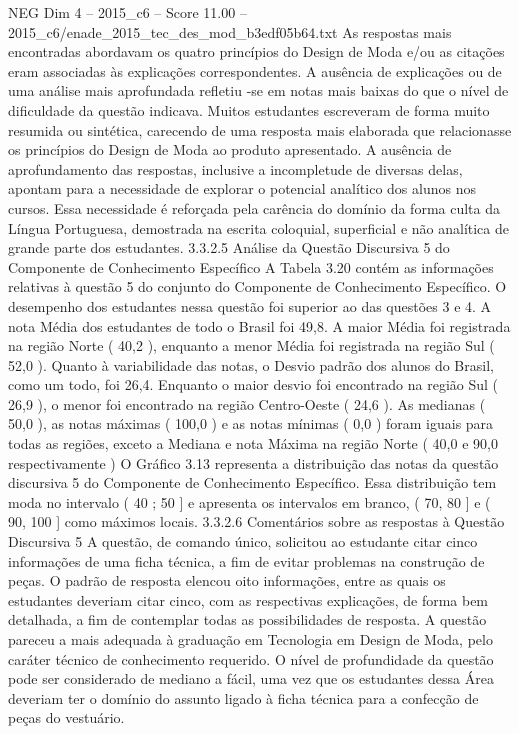 \begin{textsample}{NEG Dim 4 – 2015\_c6 – Score 11.00 – 2015\_c6/enade\_2015\_tec\_des\_mod\_b3edf05b64.txt}
As respostas mais encontradas abordavam os quatro princípios do Design de Moda e/ou as citações eram associadas às explicações correspondentes.
A ausência de explicações ou de uma análise mais aprofundada refletiu -se em notas mais baixas do que o nível de dificuldade da questão indicava.
Muitos estudantes escreveram de forma muito resumida ou sintética, carecendo de uma resposta mais elaborada que relacionasse os princípios do Design de Moda ao produto apresentado.
A ausência de aprofundamento das respostas, inclusive a incompletude de diversas delas, apontam para a necessidade de explorar o potencial analítico dos alunos nos cursos.
Essa necessidade é reforçada pela carência do domínio da forma culta da Língua Portuguesa, demostrada na escrita coloquial, superficial e não analítica de grande parte dos estudantes. 3.3.2.5 Análise da Questão Discursiva 5 do Componente de Conhecimento Específico A Tabela 3.20 contém as informações relativas à questão 5 do conjunto do Componente de Conhecimento Específico.
O desempenho dos estudantes nessa questão foi superior ao das questões 3 e 4.
A nota Média dos estudantes de todo o Brasil foi 49,8.
A maior Média foi registrada na região Norte ( 40,2 ), enquanto a menor Média foi registrada na região Sul ( 52,0 ).
Quanto à variabilidade das notas, o Desvio padrão dos alunos do Brasil, como um todo, foi 26,4.
Enquanto o maior desvio foi encontrado na região Sul ( 26,9 ), o menor foi encontrado na região Centro-Oeste ( 24,6 ).
As medianas ( 50,0 ), as notas máximas ( 100,0 ) e as notas mínimas ( 0,0 ) foram iguais para todas as regiões, exceto a Mediana e nota Máxima na região Norte ( 40,0 e 90,0 respectivamente ) O Gráfico 3.13 representa a distribuição das notas da questão discursiva 5 do Componente de Conhecimento Específico.
Essa distribuição tem moda no intervalo ( 40 ; 50 ] e apresenta os intervalos em branco, ( 70, 80 ] e ( 90, 100 ] como máximos locais. 3.3.2.6 Comentários sobre as respostas à Questão Discursiva 5 A questão, de comando único, solicitou ao estudante citar cinco informações de uma ficha técnica, a fim de evitar problemas na construção de peças.
O padrão de resposta elencou oito informações, entre as quais os estudantes deveriam citar cinco, com as respectivas explicações, de forma bem detalhada, a fim de contemplar todas as possibilidades de resposta.
A questão pareceu a mais adequada à graduação em Tecnologia em Design de Moda, pelo caráter técnico de conhecimento requerido.
O nível de profundidade da questão pode ser considerado de mediano a fácil, uma vez que os estudantes dessa Área deveriam ter o domínio do assunto ligado à ficha técnica para a confecção de peças do vestuário.

\end{textsample}
